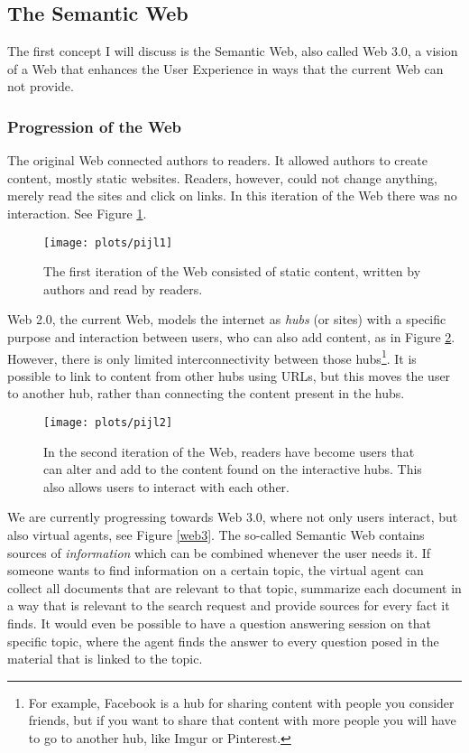 \documentclass{article}
\begin{document}
 \subsection{The Semantic Web}
  The first concept I will discuss is the Semantic Web, also called Web 3.0, a vision of a Web that enhances the User Experience in ways that the current Web can not provide.
 \subsubsection{Progression of the Web}
 The original Web connected authors to readers. It allowed authors to create content, mostly static websites. Readers, however, could not change anything, merely read the sites and click on links. In this iteration of the Web there was no interaction. See Figure \ref{web1}. %
 
 \begin{figure}[H]
 \centering
 \texttt{[image: plots/pijl1]}
 \caption[Web 1.0]{The first iteration of the Web consisted of static content, written by authors and read by readers.}
 \label{web1}
 \end{figure}
 
 Web 2.0, the current Web, models the internet as \textit{hubs} (or sites) with a specific purpose and interaction between users, who can also add content, as in Figure \ref{web2}. However, there is only limited interconnectivity between those hubs\footnote{For example, Facebook is a hub for sharing content with people you consider friends, but if you want to share that content with more people you will have to go to another hub, like Imgur or Pinterest.}. %
 It is possible to link to content from other hubs using URLs, but this moves the user to another hub, rather than connecting the content present in the hubs.
 
 \begin{figure}[H]
 \centering
 \texttt{[image: plots/pijl2]}
 \caption[Web 2.0]{In the second iteration of the Web, readers have become users that can alter and add to the content found on the interactive hubs. This also allows users to interact with each other.}
 \label{web2}
 \end{figure}
 
 We are currently progressing towards Web 3.0, where not only users interact, but also virtual agents, see Figure \ref{web3}. The so-called Semantic Web contains sources of \textit{information} which can be combined whenever the user needs it. 
 If someone wants to find information on a certain topic, the virtual agent can collect all documents that are relevant to that topic, summarize each document in a way that is relevant to the search request and provide sources for every fact it finds. It would even be possible to have a question answering session on that specific topic, where the agent finds the answer to every question posed in the material that is linked to the topic.
 
\end{document}
